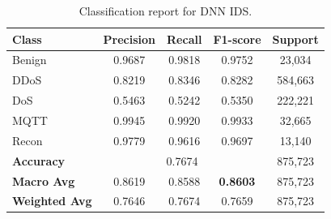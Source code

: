 \documentclass[11pt,a4paper]{article}
\begin{document}
\begin{table}[h]
    \centering
    \begin{tabular}{lcccc}
        \hline
        \textbf{Class}        & \textbf{Precision}         & \textbf{Recall} & \textbf{F1-score} & \textbf{Support} \\
        \hline
        Benign                & 0.9687                     & 0.9818          & 0.9752            & 23,034           \\
        DDoS                  & 0.8219                     & 0.8346          & 0.8282            & 584,663          \\
        DoS                   & 0.5463                     & 0.5242          & 0.5350            & 222,221          \\
        MQTT                  & 0.9945                     & 0.9920          & 0.9933            & 32,665           \\
        Recon                 & 0.9779                     & 0.9616          & 0.9697            & 13,140           \\
        \hline
        \textbf{Accuracy}     & \multicolumn{3}{c}{0.7674} & 875,723                                                \\
        \textbf{Macro Avg}    & 0.8619                     & 0.8588          & \textbf{0.8603}   & 875,723          \\
        \textbf{Weighted Avg} & 0.7646                     & 0.7674          & 0.7659            & 875,723          \\
        \hline
    \end{tabular}
    \caption{Classification report for DNN IDS. \cite{chatgpttableconv}}
    \label{tab:ClassificationReport}
\end{table}
\end{document}
